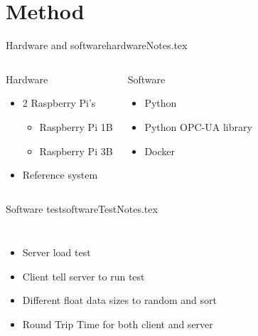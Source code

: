 \documentclass{beamer}
\begin{document}
\section{Method}
\begin{notedFrame}{Hardware and software}{hardwareNotes.tex}
	\begin{columns}[T, onlytextwidth]
			\begin{block}{Hardware}
				\begin{itemize}
					\item 2 Raspberry Pi's
					\begin{itemize}
						\item Raspberry Pi 1B
						\item Raspberry Pi 3B
					\end{itemize}
					\item Reference system
				\end{itemize}
				
			\end{block}
		\pause
			\begin{block}{Software}
				\begin{itemize}
					\item Python
					\item Python OPC-UA library
					\item Docker
				\end{itemize}
		\end{block}
	\end{columns}
\end{notedFrame}

\begin{notedFrame}{Software test}{softwareTestNotes.tex}
	\begin{columns}[T, onlytextwidth]
			\begin{itemize}
				\item Server load test
				\item Client tell server to run test
				\item Different float data sizes to random and sort
				\item Round Trip Time for both client and server
			\end{itemize}
		
	\end{columns}
\end{notedFrame}

\end{document}
